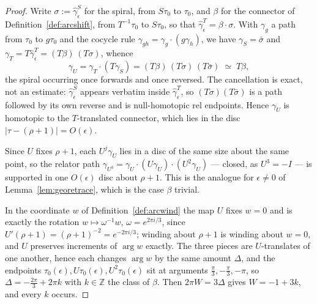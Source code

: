 \documentclass[11pt]{article}
\newcommand{\ZZ}{\mathbb{Z}}
\begin{document}
\begin{proof}
Write $\sigma:=\hat\gamma^S_\epsilon$ for the spiral, from $S\tau_0$ to $\tau_0$, and $\beta$ for
the connector of Definition~\ref{def:arcshift}, from $T^{-1}\tau_0$ to $S\tau_0$, so that
$\hat\gamma^T_\epsilon=\beta\cdot\sigma$. With $\gamma_g$ a path from $\tau_0$ to $g\tau_0$ and
the cocycle rule $\gamma_{gh}=\gamma_g\cdot(g\gamma_h)$, we have $\gamma_S=\bar\sigma$ and
$\gamma_T=T\hat\gamma^T_\epsilon=(T\beta)\,(T\sigma)$, whence
\begin{equation}\label{eq:relatorcollapse}
\gamma_U=\gamma_T\cdot(T\gamma_S)=(T\beta)\,(T\sigma)\,(T\bar\sigma)\;\simeq\;T\beta ,
\end{equation}
the spiral occurring once forwards and once reversed. The cancellation is exact, not an estimate:
$\hat\gamma^S_\epsilon$ appears verbatim inside $\hat\gamma^T_\epsilon$, so
$(T\sigma)(T\bar\sigma)$ is a path followed by its own reverse and is null-homotopic rel
endpoints. Hence $\gamma_U$ is homotopic to the $T$-translated connector, which lies in the disc
$|\tau-(\rho+1)|=O(\epsilon)$.

Since $U$ fixes $\rho+1$, each $U^j\gamma_U$ lies in a disc of the same size about the same
point, so the relator path $\gamma_{U^3}=\gamma_U\cdot(U\gamma_U)\cdot(U^2\gamma_U)$ --- closed,
as $U^3=-I$ --- is supported in one $O(\epsilon)$ disc about $\rho+1$. This is the analogue for
$\epsilon\ne0$ of Lemma~\ref{lem:georetrace}, which is the case $\beta$ trivial.

In the coordinate $w$ of Definition~\ref{def:arcwind} the map $U$ fixes $w=0$ and is exactly the
rotation $w\mapsto\omega^{-1}w$, $\omega=e^{2\pi i/3}$, since $U'(\rho+1)=(\rho+1)^{-2}
=e^{-2\pi i/3}$; winding about $\rho+1$ is winding about $w=0$, and $U$ preserves increments of
$\arg w$ exactly. The three pieces are $U$-translates of one another, hence each changes
$\arg w$ by the same amount $\Delta$, and the endpoints
$\tau_0(\epsilon),U\tau_0(\epsilon),U^2\tau_0(\epsilon)$ sit at arguments
$\tfrac{\pi}{3},-\tfrac{\pi}{3},-\pi$, so $\Delta=-\tfrac{2\pi}{3}+2\pi k$ with $k\in\ZZ$ the
class of $\beta$. Then $2\pi W=3\Delta$ gives $W=-1+3k$, and every $k$ occurs.


\end{proof}
\end{document}
